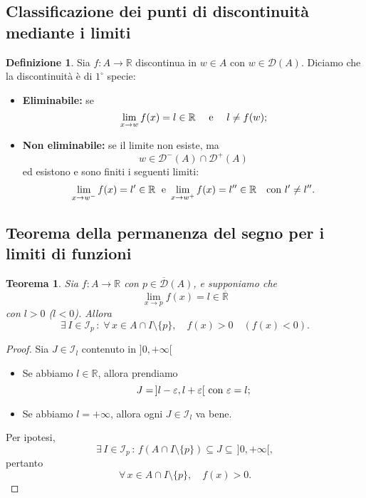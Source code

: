 \documentclass{article}
\theoremstyle{plain}
\newtheorem{thm}{Teorema}[section]
\theoremstyle{definition}
\newtheorem{defn}{Definizione}[section]
\theoremstyle{remark}
\begin{document}
\vspace{10pt}

\subsection{Classificazione dei punti di discontinuità mediante i limiti}

\vspace{10pt}

\begin{bxthm}
\begin{defn}
    Sia $f:A\to\mathbb{R}$ discontinua in $w\in A$ con $w\in \mathcal{D}(A)$.
    Diciamo che la discontinuità è di $1^\circ$ specie:
    \begin{itemize}
        \item \textbf{Eliminabile: } se \[\lim_{x\to w}f(x)=l\in\mathbb{R}\quad\textup{ e }\quad l\neq f(w);\]
        \item \textbf{Non eliminabile: } se il limite non esiste, ma \[w\in\mathcal{D}^-(A)\cap\mathcal{D}^+(A)\]
        ed esistono e sono finiti i seguenti limiti:
         \[\lim_{x\to w^-}f(x)=l'\in\mathbb{R}\;\textup{ e }\lim_{x\to w^+}f(x)=l''\in\mathbb{R}\quad\textup{con }l'\neq l''.\]
    \end{itemize}
\end{defn}
\end{bxthm}

\vspace{10pt}

\subsection{Teorema della permanenza del segno per i limiti di funzioni}

\vspace{10pt}

\begin{bxthm}
\begin{thm}
    Sia $f:A\to\mathbb{R}$ con $p\in\overline{\mathcal{D}}(A)$, e supponiamo che 
    \[\lim_{x\to p}f(x)=l\in\overline{\mathbb{R}}\] con $l>0$ ($l<0$).
    Allora 
    \[\exists\, I\in \mathcal{I}_p \,:\; \forall\, x\in A\cap I\setminus\{p\},\quad f(x)>0\quad(f(x)<0).\]
\end{thm}
\end{bxthm}
\begin{proof}
    Sia $J\in \mathcal{I}_l$ contenuto in $]0,+\infty[$ 
    \begin{itemize}
        \item Se abbiamo $l\in\mathbb{R}$, allora prendiamo \[J=\,]l-\varepsilon,l+\varepsilon[\textup{ con }\varepsilon=l;\]
        \item Se abbiamo $l=+\infty$, allora ogni $J\in \mathcal{I}_l$ va bene.
    \end{itemize}
    Per ipotesi, 
    \[\exists\, I\in \mathcal{I}_p\,:\,f(A\cap I\setminus\{p\})\subseteq J\subseteq\, ]0,+\infty[,\]
    pertanto 
    \[\forall\, x\in A\cap I\setminus\{p\},\quad f(x)>0.\]
\end{proof}
\end{document}
